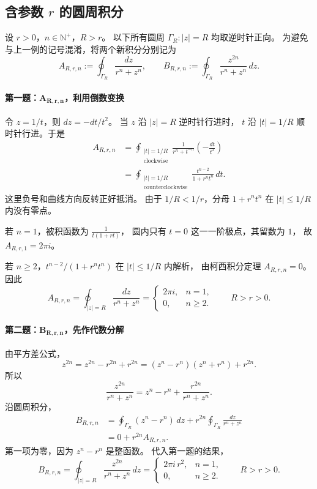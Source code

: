 \subsection*{含参数 $r$ 的圆周积分}
设 $r>0$，$n\in\mathbb N^+$，$R>r$。
以下所有圆周 $\Gamma_R:|z|=R$ 均取逆时针正向。
为避免与上一例的记号混淆，将两个新积分分别记为
\[
  A_{R,r,n}:=\oint_{\Gamma_R}\frac{dz}{r^n+z^n},
  \qquad
  B_{R,r,n}:=\oint_{\Gamma_R}\frac{z^{2n}}{r^n+z^n}\,dz.
\]

\paragraph{第一题：$\boldsymbol{A_{R,r,n}}$，利用倒数变换}
令 $z=1/t$，则 $dz=-dt/t^2$。
当 $z$ 沿 $|z|=R$ 逆时针行进时，
$t$ 沿 $|t|=1/R$ 顺时针行进。于是
\begin{align*}
  A_{R,r,n}
  &=\oint_{\substack{|t|=1/R\\\mathrm{clockwise}}}
      \frac{1}{r^n+t^{-n}}
      \left(-\frac{dt}{t^2}\right)\\
  &=\oint_{\substack{|t|=1/R\\\mathrm{counterclockwise}}}
      \frac{t^{n-2}}{1+r^n t^n}\,dt.
\end{align*}
这里负号和曲线方向反转正好抵消。
由于 $1/R<1/r$，分母 $1+r^nt^n$ 在
$|t|\le 1/R$ 内没有零点。

若 $n=1$，被积函数为
$\frac{1}{t(1+rt)}$，
圆内只有 $t=0$ 这一一阶极点，其留数为 $1$，
故 $A_{R,r,1}=2\pi i$。

若 $n\ge2$，$t^{n-2}/(1+r^nt^n)$
在 $|t|\le1/R$ 内解析，
由柯西积分定理 $A_{R,r,n}=0$。
因此
\[
  \boxed{
    A_{R,r,n}
    =\oint_{|z|=R}\frac{dz}{r^n+z^n}
    =\begin{cases}
       2\pi i,& n=1,\\
       0,& n\ge2.
      \end{cases}
    \qquad R>r>0.
  }
\]

\paragraph{第二题：$\boldsymbol{B_{R,r,n}}$，先作代数分解}
由平方差公式，
\[
  z^{2n}
  =z^{2n}-r^{2n}+r^{2n}
  =(z^n-r^n)(z^n+r^n)+r^{2n}.
\]
所以
\[
  \frac{z^{2n}}{r^n+z^n}
  =z^n-r^n+\frac{r^{2n}}{r^n+z^n}.
\]
沿圆周积分，
\begin{align*}
  B_{R,r,n}
  &=\oint_{\Gamma_R}(z^n-r^n)\,dz
    +r^{2n}\oint_{\Gamma_R}\frac{dz}{r^n+z^n}\\
  &=0+r^{2n}A_{R,r,n}.
\end{align*}
第一项为零，因为 $z^n-r^n$ 是整函数。
代入第一题的结果，
\[
  \boxed{
    B_{R,r,n}
    =\oint_{|z|=R}\frac{z^{2n}}{r^n+z^n}\,dz
    =\begin{cases}
       2\pi i\,r^2,&n=1,\\
       0,&n\ge2.
      \end{cases}
    \qquad R>r>0.
  }
\]


